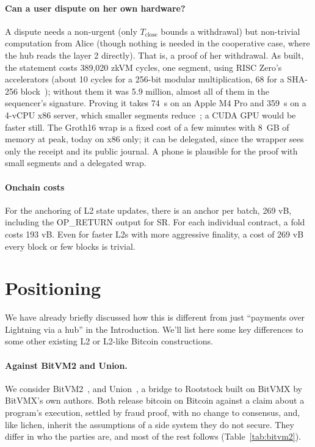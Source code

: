 \documentclass[11pt]{article}
\newcommand{\Tc}{T_{\mathrm{close}}}
\begin{document}
\paragraph{Can a user dispute on her own hardware?} A dispute needs
a non-urgent (only $\Tc$ bounds
a withdrawal) but non-trivial computation from Alice (though nothing is needed in the cooperative case, where the hub
reads the layer 2 directly). That is, a proof of her withdrawal. As built,
the statement costs 389,020 zkVM cycles, one segment, using RISC Zero's
accelerators (about 10 cycles for a 256-bit modular multiplication, 68
for a SHA-256 block~\cite{risc0accel}); without them it was 5.9
million, almost all of them in the sequencer's signature. Proving it
takes 74~s on an Apple M4 Pro and 359~s on a
4-vCPU x86 server, which smaller
segments reduce~\cite{risc0data}; a CUDA GPU would be faster still. The Groth16 wrap is a fixed cost of a few minutes with 8~GB of memory at peak, today on x86
only; it can be delegated, since the wrapper sees only the receipt and
its public journal. A phone is plausible for the proof with small segments and a delegated wrap.

\paragraph{Onchain costs} For the anchoring of L2 state updates, there is an anchor per batch, 269 vB, including the OP\_RETURN output for SR. For each individual contract, a fold costs 193 vB. Even for faster L2s with more aggressive finality, a cost of 269 vB every block or few blocks is trivial.

\section{Positioning}
\label{sec:positioning}

We have already briefly discussed how this is different from just ``payments over Lightning via a hub'' in the Introduction. We'll list here some key differences to some other existing L2 or L2-like Bitcoin constructions.

\paragraph{Against BitVM2 and Union.} We consider BitVM2~\cite{bitvm2usenix}, and
Union~\cite{union}, a bridge to Rootstock built on BitVMX by BitVMX's
own authors. Both release bitcoin on Bitcoin against a claim about
a program's execution, settled by fraud proof, with no change to
consensus, and, like lichen, inherit the assumptions of a side system they
do not secure. They differ in who the parties are, and most of the rest
follows (Table~\ref{tab:bitvm2}).
\end{document}
